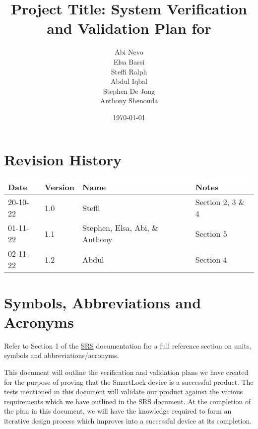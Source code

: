 \documentclass[12pt, titlepage]{article}
\begin{document}
\title{Project Title: System Verification and Validation Plan for } 
\author{Abi Nevo\\Elsa Bassi\\Steffi Ralph\\Abdul Iqbal\\Stephen De Jong\\Anthony Shenouda}
\date{\today}
	
\maketitle


\section{Revision History}

\begin{tabularx}{\textwidth}{p{2cm}p{2cm}p{2cm}X}
\toprule {\bf Date} & {\bf Version} & {\bf Name} & {\bf Notes}\\
\midrule
20-10-22 & 1.0 & Steffi & Section 2, 3 \& 4\\
01-11-22 & 1.1 & Stephen, Elsa, Abi, \& Anthony & Section 5\\
02-11-22 & 1.2 & Abdul & Section 4\\
\bottomrule
\end{tabularx}

\newpage

\tableofcontents

\listoftables


\newpage

\section{Symbols, Abbreviations and Acronyms}

Refer to Section 1 of the \href{https://github.com/NevoAbigail/Capstone/blob/main/docs/SRS/SRS.pdf}{SRS} documentation for a full reference section on units, symbols and abbreviations/acronyms.

\newpage


This document will outline the verification and validation plans we have created for the purpose of proving that the SmartLock device is a successful product. The tests mentioned in this document will validate our product against the various requirements which we have outlined in the SRS document. At the completion of the plan in this document, we will have the knowledge required to form an iterative design process which improves into a successful device at its completion. 
\end{document}
